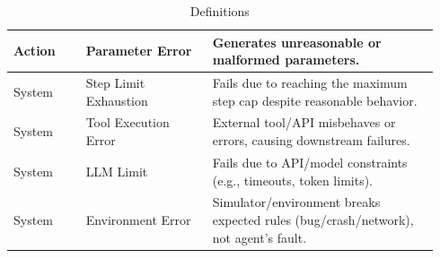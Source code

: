 \begin{table}[htbp]
\begin{tabular}{p{0.16\linewidth} p{0.28\linewidth} p{0.50\linewidth}}
\rowcolor{yellow!15}Action & Parameter Error             & Generates unreasonable or malformed parameters. \\
\hline
\rowcolor{red!15}System & Step Limit Exhaustion  & Fails due to reaching the maximum step cap despite reasonable behavior. \\
\rowcolor{red!15}System & Tool Execution Error   & External tool/API misbehaves or errors, causing downstream failures. \\
\rowcolor{red!15}System & LLM Limit              & Fails due to API/model constraints (e.g., timeouts, token limits). \\
\rowcolor{red!15}System & Environment Error      & Simulator/environment breaks expected rules (bug/crash/network), not agent’s fault. \\

\bottomrule
\end{tabular}
\caption{\AET{} Definitions}
\end{table}

